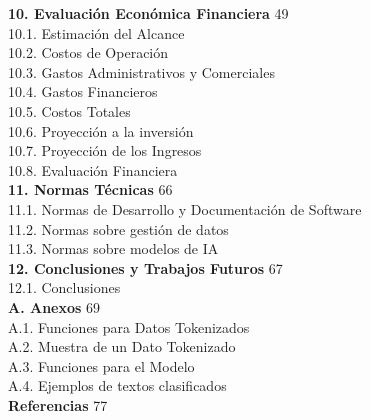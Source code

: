 \noindent \textbf{10. Evaluación Económica Financiera} \hfill 49\\
\hspace*{1cm}10.1. Estimación del Alcance \\
\hspace*{1cm}10.2. Costos de Operación \\
\hspace*{1cm}10.3. Gastos Administrativos y Comerciales \\
\hspace*{1cm}10.4. Gastos Financieros \\
\hspace*{1cm}10.5. Costos Totales \\
\hspace*{1cm}10.6. Proyección a la inversión \\
\hspace*{1cm}10.7. Proyección de los Ingresos \\
\hspace*{1cm}10.8. Evaluación Financiera \\[0.3cm]

\noindent \textbf{11. Normas Técnicas} \hfill 66\\
\hspace*{1cm}11.1. Normas de Desarrollo y Documentación de Software \\
\hspace*{1cm}11.2. Normas sobre gestión de datos \\
\hspace*{1cm}11.3. Normas sobre modelos de IA \\[0.3cm]

\noindent \textbf{12. Conclusiones y Trabajos Futuros} \hfill 67\\
\hspace*{1cm}12.1. Conclusiones \\[0.3cm]

\noindent \textbf{A. Anexos} \hfill 69\\
\hspace*{1cm}A.1. Funciones para Datos Tokenizados \\
\hspace*{1cm}A.2. Muestra de un Dato Tokenizado \\
\hspace*{1cm}A.3. Funciones para el Modelo \\
\hspace*{1cm}A.4. Ejemplos de textos clasificados \\[0.3cm]

\noindent \textbf{Referencias} \hfill 77

